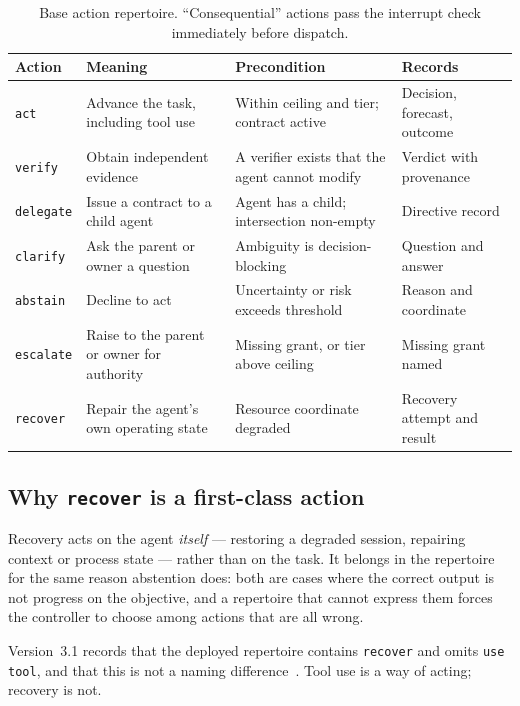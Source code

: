 \documentclass[11pt]{article}
\newcommand{\code}[1]{\texttt{\small #1}}
\begin{document}
\begin{table}[h]
\centering\small
\caption{Base action repertoire. ``Consequential'' actions pass the interrupt check immediately before dispatch.}
\label{tab:actions}
\begin{tabular}{@{}L{1.9cm}L{5.4cm}L{3.0cm}L{3.4cm}@{}}
\toprule
\textbf{Action} & \textbf{Meaning} & \textbf{Precondition} & \textbf{Records} \\
\midrule
\code{act} & Advance the task, including tool use & Within ceiling and tier; contract active & Decision, forecast, outcome \\
\code{verify} & Obtain independent evidence & A verifier exists that the agent cannot modify & Verdict with provenance \\
\code{delegate} & Issue a contract to a child agent & Agent has a child; intersection non-empty & Directive record \\
\code{clarify} & Ask the parent or owner a question & Ambiguity is decision-blocking & Question and answer \\
\code{abstain} & Decline to act & Uncertainty or risk exceeds threshold & Reason and coordinate \\
\code{escalate} & Raise to the parent or owner for authority & Missing grant, or tier above ceiling & Missing grant named \\
\code{recover} & Repair the agent's own operating state & Resource coordinate degraded & Recovery attempt and result \\
\bottomrule
\end{tabular}
\end{table}

\subsection{Why \code{recover} is a first-class action}

Recovery acts on the agent \emph{itself} --- restoring a degraded session, repairing context or process state --- rather than on the task. It belongs in the repertoire for the same reason abstention does: both are cases where the correct output is not progress on the objective, and a repertoire that cannot express them forces the controller to choose among actions that are all wrong.

Version~3.1 records that the deployed repertoire contains \code{recover} and omits \code{use tool}, and that this is not a naming difference~\citep{yang2026v31}. Tool use is a way of acting; recovery is not.
\end{document}
